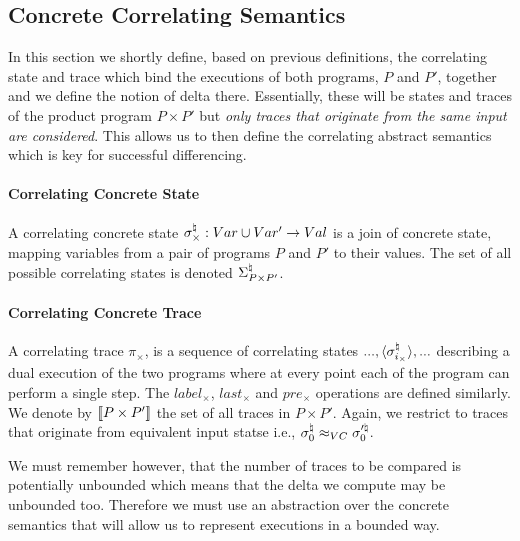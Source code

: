 \subsection{Concrete Correlating Semantics} 

In this section we shortly define, based on previous definitions, the correlating state and trace which bind the executions of both programs, $P$ and $P'$, together and we define the notion of delta there. Essentially, these will be states and traces of the product program $P \times P'$ but \emph{only traces that originate from the same input are considered}. This allows us to then define the correlating abstract semantics which is key for successful differencing.

\paragraph{Correlating Concrete State} 
A correlating concrete state $\sigma^\natural_{\times} : Var \cup Var' \rightarrow Val$ is a join of concrete state, mapping variables from a pair of programs $P$ and $P'$ to their values. The set of all possible correlating states is denoted $\Sigma^\natural_{P \times P'}$.

\paragraph{Correlating Concrete Trace} 
A correlating trace $\pi_{\times}$, is a sequence of correlating states $...,\langle \sigma^\natural_{i_{\times}} \rangle,...$ describing a dual execution of the two programs where at every point each of the program can perform a single step. The $label_{\times}$, $last_{\times}$ and $pre_{\times}$ operations are defined similarly. We denote by $\lbrack\!\lbrack P \times P' \rbrack\!\rbrack$ the set of all traces in $P \times P'$. Again, we restrict to traces that originate from equivalent input statse i.e., $\sigma^\natural_0 \approx_{VC} \sigma'^\natural_0$.

We must remember however, that the number of traces to be compared is potentially unbounded which means that the delta we compute may be unbounded too. Therefore we must use an abstraction over the concrete semantics that will allow us to represent executions in a bounded way.

